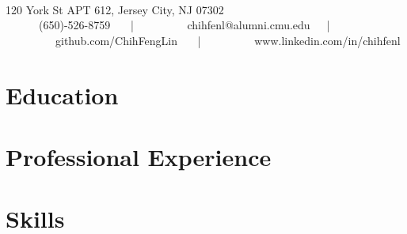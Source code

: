 \documentclass[10pt]{article} %
\begin{document}
\color{text1} %


\par{\\[0.5\baselineskip] %

{ 120 York St APT 612, Jersey City, NJ 07302}\\

{\ \ \ \faMobilePhone \ \ \  (650)-526-8759 \ \ \ | \ \ \  
\  \ \ \faEnvelope \ \ \ chihfenl@alumni.cmu.edu\ \ \ | \ \ \   
\  \ \ \faGithub \ \ \ github.com/ChihFengLin \ \ \ | \ \ \  
\  \ \ \faLinkedin \ \ \ www.linkedin.com/in/chihfenl }
	

\begin{minipage}[t]{0.5\textwidth} %
\vspace{0pt} %

\section{Education}



\section{Professional Experience} 





\end{minipage} %
\hfill
\begin{minipage}[t]{0.47\textwidth} %
\vspace{0pt} %

\section{Skills} 


\end{minipage}}
\end{document}
